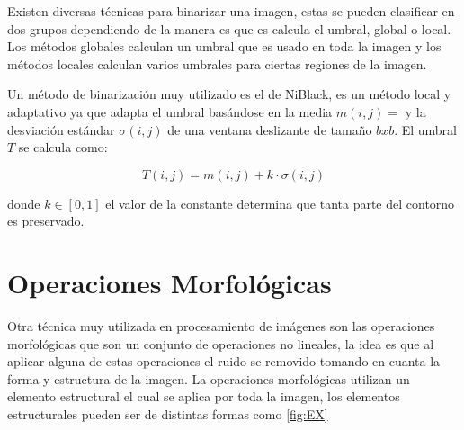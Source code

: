 Existen diversas técnicas para binarizar una imagen, estas se pueden clasificar en dos grupos dependiendo de la manera es que es calcula el umbral, global o local. Los métodos globales calculan un umbral que es usado en toda la imagen y los métodos locales calculan varios umbrales para ciertas regiones de la imagen.  

Un método de binarización muy utilizado es el de NiBlack, \citep{Chaki2014} es un método local y adaptativo ya que adapta el umbral basándose en la media $m(i,j)=$ y la desviación estándar $\sigma(i,j)$ de una ventana deslizante de tamaño $bxb$. El umbral $T$  se calcula como: 

$$T(i,j)=m(i,j)+k \cdot \sigma(i,j)$$ 

donde $k \in [0,1]$ el valor de la constante determina que tanta parte del contorno es preservado.


  
\section{Operaciones Morfológicas}\label{OperacionesMorfologicas} 

Otra técnica muy utilizada en procesamiento de imágenes son las operaciones morfológicas que son un conjunto de operaciones no lineales, la idea es que al aplicar alguna de estas operaciones el ruido se removido tomando en cuanta la forma y estructura de la imagen. 
La operaciones morfológicas utilizan un elemento estructural el cual se aplica por toda la imagen, los elementos estructurales pueden ser de distintas formas como \ref{fig:EX}

